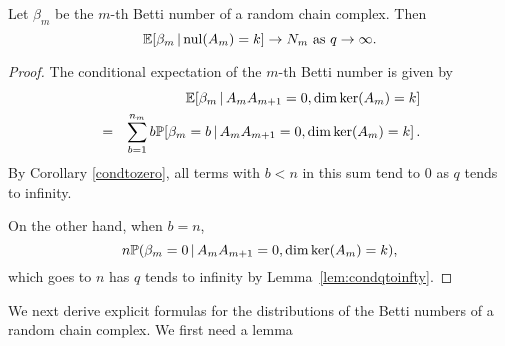 \begin{corollary}
Let $\beta_m$ be the $m$-th Betti number of a random chain complex.  Then 
\[
\mathbb{E}[\beta_m \,|\, \mathrm{nul}(A_{m}) = k ] \to  N_m\textrm{ as } q\to\infty.
\]
\begin{proof}
The conditional expectation of the $m$-th Betti number is given by
	\begin{eqnarray*}
	& & \mathbb{E}[\beta_m \,|\, A_{m}A_{m+1} = 0, \dim\ker(A_{m}) = k ]\\
	&=& \sum_{b=1}^{n_m} b \mathbb{P}[\beta_m = b \,|\, A_{m}A_{m+1} = 0, \dim\ker(A_{m}) = k ] \, .
	\end{eqnarray*}
By Corollary \ref{condtozero}, all terms with $b< n$ in this sum tend to 
$0$ as $q$ tends to infinity. 

On the other hand, when $b=n$, 
\[
n\mathbb{P}(\beta_m=0\,|\, A_{m}A_{m+1} = 0, \dim\ker(A_{m}) = k ),
\]
which goes to $n$ has $q$ tends to infinity by Lemma~\ref{lem:condqtoinfty}.
\end{proof}
\end{corollary}

We next derive explicit formulas for the distributions of the Betti numbers of a random chain complex. We first need a lemma

